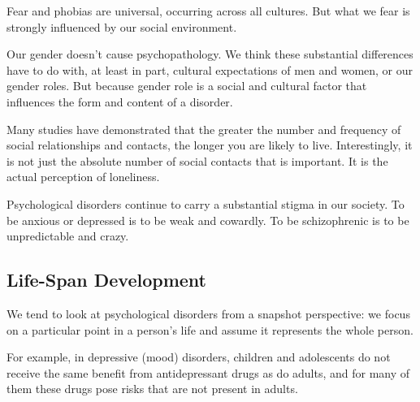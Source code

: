 Fear and phobias are universal, occurring across all cultures.
But what we fear is strongly influenced by our social environment.

Our gender doesn’t cause psychopathology.
We think these substantial differences have to do with, at least in part, cultural expectations of men and women, or our gender roles.
But because gender role is a social and cultural factor that influences the form and content of a disorder.

Many studies have demonstrated that the greater the number and frequency of social relationships and contacts, the longer you are likely to live.
Interestingly, it is not just the absolute number of social contacts that is important.
It is the actual perception of loneliness.

Psychological disorders continue to carry a substantial stigma in our society.
To be anxious or depressed is to be weak and cowardly.
To be schizophrenic is to be unpredictable and crazy.

\subsection{Life-Span Development}\label{subsec:Life-Span_Development}
We tend to look at psychological disorders from a snapshot perspective: we focus on a particular point in a person’s life and assume it represents the whole person.

For example, in depressive (mood) disorders, children and adolescents do not receive the same benefit from antidepressant drugs as do adults, and for many of them these drugs pose risks that are not present in adults.

